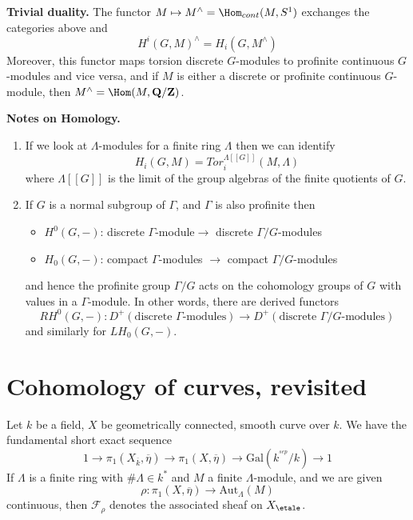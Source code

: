 \medskip\noindent
{\bf Trivial duality.}
The functor $M\mapsto M^\wedge = \Hom_{cont}(M, S^1)$
exchanges the categories above and
$$
H^i(G, M)^\wedge = H_i(G, M^\wedge)
$$
Moreover, this functor maps torsion discrete $G$-modules to profinite
continuous $G$-modules and vice versa, and if $M$ is either a discrete or
profinite continuous $G$-module, then
$M^\wedge = \Hom(M, \mathbf{Q}/\mathbf{Z})$.

\medskip\noindent
{\bf Notes on Homology.}
\begin{enumerate}
\item If we look at $\Lambda$-modules for a finite ring $\Lambda$
then we can identify
$$
H_i(G, M)=Tor_i^{\Lambda[[G]]}(M, \Lambda)
$$
where $\Lambda[[G]]$ is the limit of the group algebras of the finite
quotients of $G$.
\item If $G$ is a normal subgroup of $\Gamma$, and $\Gamma$ is also
profinite then
\begin{itemize}
\item $H^0(G, -)$: discrete $\Gamma$-module$\to$ discrete
$\Gamma/G$-modules
\item $H_0(G, -)$: compact $\Gamma$-modules $\to$ compact
$\Gamma/G$-modules
\end{itemize}
and hence the profinite group $\Gamma/G$ acts on the cohomology groups
of $G$ with values in a $\Gamma$-module. In other words, there are derived
functors
$$
RH^0(G, -) :
D^{+}(\text{discrete }\Gamma\text{-modules})
\longrightarrow
D^{+}(\text{discrete }\Gamma/G\text{-modules})
$$
and similarly for $LH_0(G, -)$.
\end{enumerate}








\section{Cohomology of curves, revisited}
\label{section-cohomology-curves-revisited}

\noindent
Let $k$ be a field, $X$ be geometrically connected, smooth curve over $k$.
We have the fundamental short exact sequence
$$
1 \to
\pi_1(X_{\overline{k}}, \overline \eta) \to
\pi_1(X, \overline\eta) \to
\text{Gal}(k^{^{sep}}/k) \to 1
$$
If $\Lambda$ is a finite ring with $\#\Lambda\in k^*$ and $M$ a finite
$\Lambda$-module, and we are given
$$
\rho : \pi_1(X, \overline\eta) \to \text{Aut}_{\Lambda}(M)
$$
continuous, then $\mathcal{F}_\rho$ denotes the associated sheaf on
$X_\etale$.

